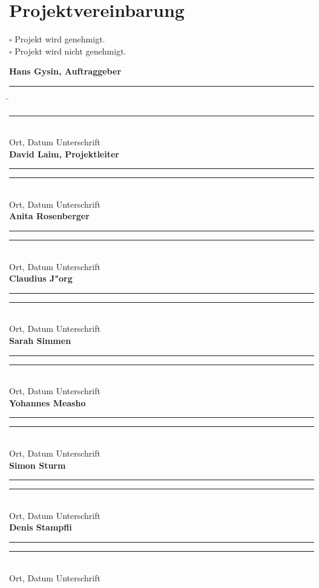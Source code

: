 \section{Projektvereinbarung}

$\square$ Projekt wird genehmigt.\\
$\square$ Projekt wird nicht genehmigt.\\
\begin{tabbing}
\textbf{Hans Gysin, Auftraggeber} \\[3ex]
\noindent\rule{0.4\textwidth}{1pt} \hspace{6em} \=  \noindent\rule{0.4\textwidth}{1pt} \\ Ort, Datum \> Unterschrift \\[2ex] 

\textbf{David Laim, Projektleiter} \\[3ex]
\noindent\rule{0.4\textwidth}{1pt} \>  \noindent\rule{0.4\textwidth}{1pt} \\ Ort, Datum \> Unterschrift \\[2ex]

\textbf{Anita Rosenberger} \\[3ex]
\noindent\rule{0.4\textwidth}{1pt} \>  \noindent\rule{0.4\textwidth}{1pt} \\ Ort, Datum \> Unterschrift \\[2ex]

\textbf{Claudius J"org} \\[3ex]
\noindent\rule{0.4\textwidth}{1pt} \>  \noindent\rule{0.4\textwidth}{1pt} \\ Ort, Datum \> Unterschrift \\[2ex]

\textbf{Sarah Simmen} \\[3ex]
\noindent\rule{0.4\textwidth}{1pt} \>  \noindent\rule{0.4\textwidth}{1pt} \\ Ort, Datum \> Unterschrift \\[2ex]

\textbf{Yohannes Measho} \\[3ex]
\noindent\rule{0.4\textwidth}{1pt} \>  \noindent\rule{0.4\textwidth}{1pt} \\ Ort, Datum \> Unterschrift \\[2ex]

\textbf{Simon Sturm} \\[3ex]
\noindent\rule{0.4\textwidth}{1pt} \>  \noindent\rule{0.4\textwidth}{1pt} \\ Ort, Datum \> Unterschrift \\[2ex]

\textbf{Denis Stampfli} \\[3ex]
\noindent\rule{0.4\textwidth}{1pt} \>  \noindent\rule{0.4\textwidth}{1pt} \\ Ort, Datum \> Unterschrift \\[2ex]

\end{tabbing}
